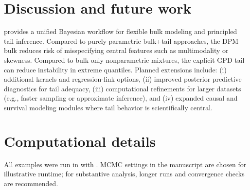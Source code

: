\documentclass[article]{jss}\usepackage[]{graphicx}\usepackage[]{xcolor}
\begin{document}
\section{Discussion and future work}

 provides a unified Bayesian workflow for flexible bulk modeling and principled tail inference.
Compared to purely parametric bulk+tail approaches, the DPM bulk reduces risk of misspecifying central features such as multimodality or skewness.
Compared to bulk-only nonparametric mixtures, the explicit GPD tail can reduce instability in extreme quantiles.
Planned extensions include: (i) additional kernels and regression-link options, (ii) improved posterior predictive diagnostics for tail adequacy, (iii) computational refinements for larger datasets (e.g., faster sampling or approximate inference), and (iv) expanded causal and survival modeling modules where tail behavior is scientifically central.

\section*{Computational details}

All examples were run in  with .
MCMC settings in the manuscript are chosen for illustrative runtime;
for substantive analysis, longer runs and convergence checks are recommended.


\end{document}
